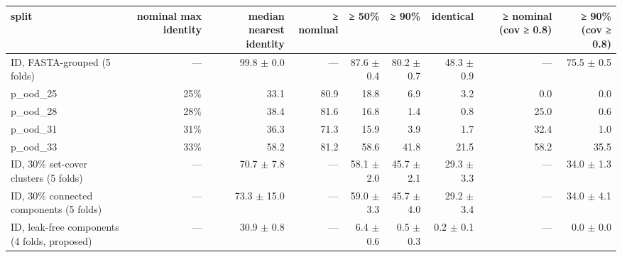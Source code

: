 \begin{tabular}{lrrrrrrrr}
\toprule
split & nominal max identity & median nearest identity & ≥ nominal & ≥ 50\% & ≥ 90\% & identical & ≥ nominal (cov ≥ 0.8) & ≥ 90\% (cov ≥ 0.8) \\ \midrule
ID, FASTA-grouped (5 folds) & — & 99.8 $\pm$ 0.0 & — & 87.6 $\pm$ 0.4 & 80.2 $\pm$ 0.7 & 48.3 $\pm$ 0.9 & — & 75.5 $\pm$ 0.5 \\
p\_ood\_25 & 25\% & 33.1 & 80.9 & 18.8 & 6.9 & 3.2 & 0.0 & 0.0 \\
p\_ood\_28 & 28\% & 38.4 & 81.6 & 16.8 & 1.4 & 0.8 & 25.0 & 0.6 \\
p\_ood\_31 & 31\% & 36.3 & 71.3 & 15.9 & 3.9 & 1.7 & 32.4 & 1.0 \\
p\_ood\_33 & 33\% & 58.2 & 81.2 & 58.6 & 41.8 & 21.5 & 58.2 & 35.5 \\
ID, 30\% set-cover clusters (5 folds) & — & 70.7 $\pm$ 7.8 & — & 58.1 $\pm$ 2.0 & 45.7 $\pm$ 2.1 & 29.3 $\pm$ 3.3 & — & 34.0 $\pm$ 1.3 \\
ID, 30\% connected components (5 folds) & — & 73.3 $\pm$ 15.0 & — & 59.0 $\pm$ 3.3 & 45.7 $\pm$ 4.0 & 29.2 $\pm$ 3.4 & — & 34.0 $\pm$ 4.1 \\
ID, leak-free components (4 folds, proposed) & — & 30.9 $\pm$ 0.8 & — & 6.4 $\pm$ 0.6 & 0.5 $\pm$ 0.3 & 0.2 $\pm$ 0.1 & — & 0.0 $\pm$ 0.0 \\
\bottomrule
\end{tabular}
